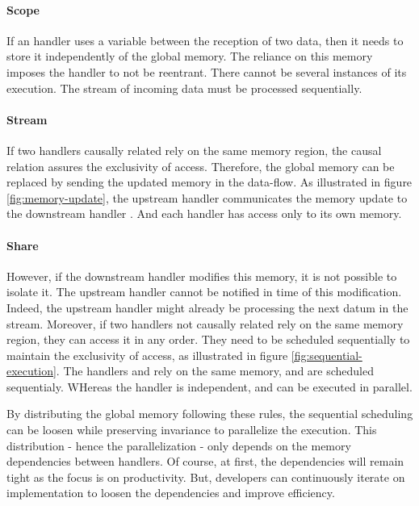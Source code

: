 \paragraph{Scope}
If an handler uses a variable between the reception of two data, then it needs to store it independently of the global memory.
The reliance on this memory imposes the handler to not be reentrant.
There cannot be several instances of its execution.
The stream of incoming data must be processed sequentially.


\paragraph{Stream}
If two handlers causally related rely on the same memory region, the causal relation assures the exclusivity of access. Therefore, the global memory can be replaced by sending the updated memory in the data-flow.
As illustrated in figure \ref{fig:memory-update}, the upstream handler  communicates the memory update to the downstream handler .
And each handler has access only to its own memory.

\paragraph{Share}
However, if the downstream handler modifies this memory, it is not possible to isolate it.
The upstream handler cannot be notified in time of this modification.
Indeed, the upstream handler might already be processing the next datum in the stream.
Moreover, if two handlers not causally related rely on the same memory region, they can access it in any order.
They need to be scheduled sequentially to maintain the exclusivity of access, as illustrated in figure \ref{fig:sequential-execution}.
The handlers  and  rely on the same memory, and are scheduled sequentialy.
WHereas the handler  is independent, and can be executed in parallel.

\separator

By distributing the global memory following these rules, the sequential scheduling can be loosen while preserving invariance to parallelize the execution.
This distribution - hence the parallelization - only depends on the memory dependencies between handlers.
Of course, at first, the dependencies will remain tight as the focus is on productivity.
But, developers can continuously iterate on implementation to loosen the dependencies and improve efficiency.

